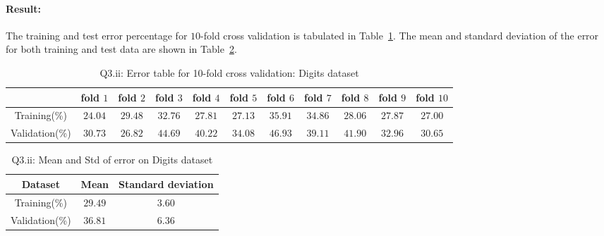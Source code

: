 \paragraph{Result:} The training and test error percentage for $10$-fold cross validation is tabulated in Table~\ref{tbl:3_ii_folds}. The mean and standard deviation of the error for both training and test data are shown in Table~\ref{tbl:3_ii_mean_std}.
\begin{table}[ht]
	\centering
	\caption{Q3.ii: Error table for 10-fold cross validation: Digits dataset}
	\begin{tabular}{ccccccccccc} 
		\hline
		& fold $1$ & fold $2$ & fold $3$ & fold $4$ & fold $5$ & fold $6$ & fold $7$ & fold $8$ & fold $9$ & fold $10$\\ [0.5ex] 
		\hline
		Training(\%) & $24.04$ & $29.48$ & $32.76$ & $27.81$ & $27.13$ & $35.91$ & $34.86$ & $28.06$ & $27.87$ & $27.00$\\
		Validation(\%) & $30.73$ & $26.82$ & $44.69$ & $40.22$ & $34.08$ & $46.93$ & $39.11$ & $41.90$ & $32.96$ & $30.65$\\[1ex]
		\hline
	\end{tabular}
	\label{tbl:3_ii_folds}
\end{table}
\begin{table}[ht]
	\centering
	\caption{Q3.ii: Mean and Std of error on Digits dataset}
	\begin{tabular}{ccc} 
		\hline
		Dataset & Mean & Standard deviation\\ [0.5ex] 
		\hline
		Training(\%) & $29.49$ & $3.60$\\
		Validation(\%) & $36.81$ & $6.36$\\[1ex]
		\hline
	\end{tabular}
	\label{tbl:3_ii_mean_std}
\end{table}